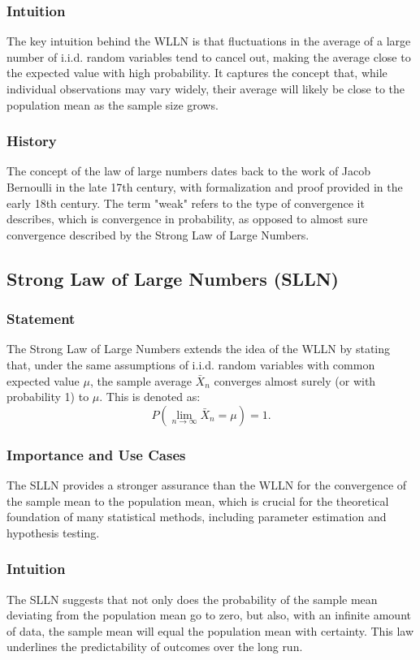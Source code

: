 \documentclass{article}
\begin{document}
\subsubsection{Intuition}
The key intuition behind the WLLN is that fluctuations in the average of a large number of i.i.d. random variables tend to cancel out, making the average close to the expected value with high probability. It captures the concept that, while individual observations may vary widely, their average will likely be close to the population mean as the sample size grows.

\subsubsection{History}
The concept of the law of large numbers dates back to the work of Jacob Bernoulli in the late 17th century, with formalization and proof provided in the early 18th century. The term "weak" refers to the type of convergence it describes, which is convergence in probability, as opposed to almost sure convergence described by the Strong Law of Large Numbers.

\subsection{Strong Law of Large Numbers (SLLN)}

\subsubsection{Statement}
The Strong Law of Large Numbers extends the idea of the WLLN by stating that, under the same assumptions of i.i.d. random variables with common expected value \( \mu \), the sample average \( \bar{X}_n \) converges almost surely (or with probability 1) to \( \mu \). This is denoted as:
\[ P\left(\lim_{n \rightarrow \infty} \bar{X}_n = \mu\right) = 1. \]

\subsubsection{Importance and Use Cases}
The SLLN provides a stronger assurance than the WLLN for the convergence of the sample mean to the population mean, which is crucial for the theoretical foundation of many statistical methods, including parameter estimation and hypothesis testing.

\subsubsection{Intuition}
The SLLN suggests that not only does the probability of the sample mean deviating from the population mean go to zero, but also, with an infinite amount of data, the sample mean will equal the population mean with certainty. This law underlines the predictability of outcomes over the long run.
\end{document}
